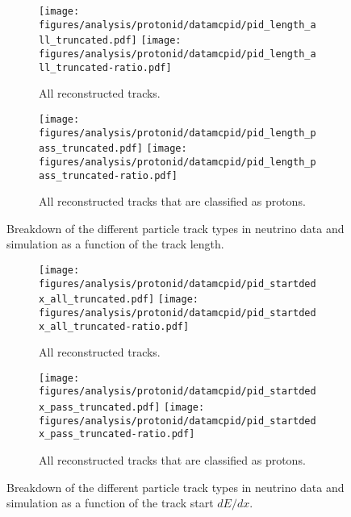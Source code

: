     \begin{figure}[h]
      \centering
      \begin{subfigure}[t]{2.8in}
        \texttt{[image: figures/analysis/protonid/datamcpid/pid\_length\_all\_truncated.pdf]}
        \texttt{[image: figures/analysis/protonid/datamcpid/pid\_length\_all\_truncated-ratio.pdf]}
        \caption{All reconstructed tracks.}
      \end{subfigure}
      \hspace{2pt}
      \begin{subfigure}[t]{2.8in}
        \texttt{[image: figures/analysis/protonid/datamcpid/pid\_length\_pass\_truncated.pdf]}
        \texttt{[image: figures/analysis/protonid/datamcpid/pid\_length\_pass\_truncated-ratio.pdf]}
        \caption{All reconstructed tracks that are classified as protons.}
      \end{subfigure}
      \caption{Breakdown of the different particle track types in neutrino data
      and simulation as a function of the track length.}
      \label{fig:pidlength}
    \end{figure}
    \begin{figure}[h]
      \centering
      \begin{subfigure}[t]{2.8in}
        \texttt{[image: figures/analysis/protonid/datamcpid/pid\_startdedx\_all\_truncated.pdf]}
        \texttt{[image: figures/analysis/protonid/datamcpid/pid\_startdedx\_all\_truncated-ratio.pdf]}
        \caption{All reconstructed tracks.}
      \end{subfigure}
      \hspace{2pt}
      \begin{subfigure}[t]{2.8in}
        \texttt{[image: figures/analysis/protonid/datamcpid/pid\_startdedx\_pass\_truncated.pdf]}
        \texttt{[image: figures/analysis/protonid/datamcpid/pid\_startdedx\_pass\_truncated-ratio.pdf]}
        \caption{All reconstructed tracks that are classified as protons.}
      \end{subfigure}
      \caption{Breakdown of the different particle track types in neutrino data
      and simulation as a function of the track start $dE/dx$.}
      \label{fig:piddedx}
    \end{figure}
